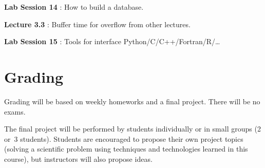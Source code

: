 \documentclass{article}
\newcommand*{\Lecture}[1]{%
{\bf #1}%
}
\begin{document}
\Lecture{Lab Session 14}: How to build a database.

\Lecture{Lecture 3.3}: Buffer time for overflow from other lectures.

\Lecture{Lab Session 15}: Tools for interface Python/C/C++/Fortran/R/\dots

\section{Grading}

Grading will be based on weekly homeworks and a final project. There will be no exams.

The final project will be performed by students individually or in small groups (2 or~3 students). Students are encouraged to propose their own project topics (solving a scientific problem using techniques and technologies learned in this course), but instructors will also propose ideas.
\end{document}
